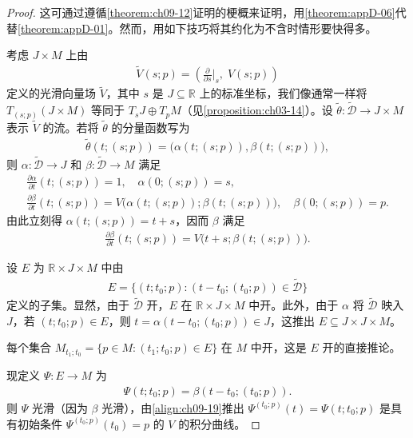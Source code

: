 \documentclass[../../main.tex]{subfiles}
\begin{document}
\begin{proof}
这可通过遵循\cref{theorem:ch09-12}证明的梗概来证明，用\cref{theorem:appD-06}代替\cref{theorem:appD-01}。然而，用如下技巧将其约化为不含时情形要快得多。

考虑 $J\times M$ 上由
\begin{align*}
\widetilde{V}(s;p)=\left(\frac{\partial}{\partial s}\bigg|_s,\;V(s;p)\right)
\end{align*}
定义的光滑向量场 $\widetilde{V}$，其中 $s$ 是 $J\subseteq\mathbb{R}$ 上的标准坐标，我们像通常一样将 $T_{(s;p)}(J\times M)$ 等同于 $T_sJ\oplus T_pM$（见\cref{proposition:ch03-14}）。设 $\widetilde{\theta}\colon\widetilde{\mathscr{D}}\to J\times M$ 表示 $\widetilde{V}$ 的流。若将 $\widetilde{\theta}$ 的分量函数写为
\begin{align*}
\widetilde{\theta}(t;(s;p))=\bigl(\alpha(t;(s;p)),\beta(t;(s;p))\bigr),
\end{align*}
则 $\alpha\colon\widetilde{\mathscr{D}}\to J$ 和 $\beta\colon\widetilde{\mathscr{D}}\to M$ 满足
\begin{align*}
\frac{\partial\alpha}{\partial t}(t;(s;p))=1,\quad \alpha(0;(s;p))=s,\\
\frac{\partial\beta}{\partial t}(t;(s;p))=V\bigl(\alpha(t;(s;p));\beta(t;(s;p))\bigr),\quad \beta(0;(s;p))=p.
\end{align*}
由此立刻得 $\alpha(t;(s;p))=t+s$，因而 $\beta$ 满足
\begin{align}
\frac{\partial\beta}{\partial t}(t;(s;p))=V\bigl(t+s;\beta(t;(s;p))\bigr). \label{align:ch09-19}
\end{align}

设 $E$ 为 $\mathbb{R}\times J\times M$ 中由
\begin{align*}
E=\{(t;t_0;p):(t-t_0;(t_0;p))\in\widetilde{\mathscr{D}}\}
\end{align*}
定义的子集。显然，由于 $\widetilde{\mathscr{D}}$ 开，$E$ 在 $\mathbb{R}\times J\times M$ 中开。此外，由于 $\alpha$ 将 $\widetilde{\mathscr{D}}$ 映入 $J$，若 $(t;t_0;p)\in E$，则 $t=\alpha(t-t_0;(t_0;p))\in J$，这推出 $E\subseteq J\times J\times M$。

每个集合 $M_{t_1;t_0}=\{p\in M:(t_1;t_0;p)\in E\}$ 在 $M$ 中开，这是 $E$ 开的直接推论。

现定义 $\Psi\colon E\to M$ 为
\begin{align*}
\Psi(t;t_0;p)=\beta(t-t_0;(t_0;p)).
\end{align*}
则 $\Psi$ 光滑（因为 $\beta$ 光滑），由\eqref{align:ch09-19}推出 $\Psi^{(t_0;p)}(t)=\Psi(t;t_0;p)$ 是具有初始条件 $\Psi^{(t_0;p)}(t_0)=p$ 的 $V$ 的积分曲线。


\end{proof}
\end{document}
